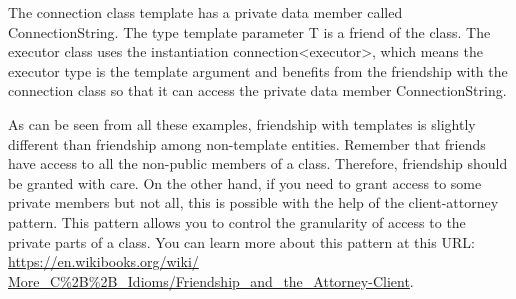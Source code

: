 The connection class template has a private data member called ConnectionString. The type template parameter T is a friend of the class. The executor class uses the instantiation connection<executor>, which means the executor type is the template argument and benefits from the friendship with the connection class so that it can access the private data member ConnectionString.
 
As can be seen from all these examples, friendship with templates is slightly different than friendship among non-template entities. Remember that friends have access to all the non-public members of a class. Therefore, friendship should be granted with care. On the other hand, if you need to grant access to some private members but not all, this is possible with the help of the client-attorney pattern. This pattern allows you to control the granularity of access to the private parts of a class. You can learn more about this pattern at this URL: \url{https://en.wikibooks.org/wiki/ More_C%2B%2B_Idioms/Friendship_and_the_Attorney-Client}.


